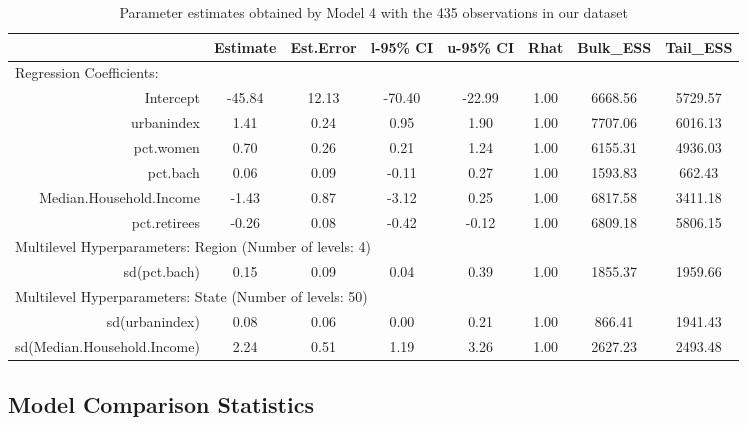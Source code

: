 \documentclass[12pt]{article}
\begin{document}
\begin{table}[ht]
	\centering
	\begin{adjustbox}{max width=\textwidth}
	\begin{tabular}{rccccccc}
		\hline
		& Estimate & Est.Error & l-95\% CI & u-95\% CI & Rhat & Bulk\_ESS & Tail\_ESS \\ 
		\hline
				 \multicolumn{8}{l}{Regression Coefficients:} \\
		Intercept & -45.84 & 12.13 & -70.40 & -22.99 & 1.00 & 6668.56 & 5729.57 \\ 
		urbanindex & 1.41 & 0.24 & 0.95 & 1.90 & 1.00 & 7707.06 & 6016.13 \\ 
		pct.women & 0.70 & 0.26 & 0.21 & 1.24 & 1.00 & 6155.31 & 4936.03 \\ 
		pct.bach & 0.06 & 0.09 & -0.11 & 0.27 & 1.00 & 1593.83 & 662.43 \\ 
		Median.Household.Income & -1.43 & 0.87 & -3.12 & 0.25 & 1.00 & 6817.58 & 3411.18 \\ 
		pct.retirees & -0.26 & 0.08 & -0.42 & -0.12 & 1.00 & 6809.18 & 5806.15 \\
		\midrule
		\multicolumn{8}{l}{Multilevel Hyperparameters: Region (Number of levels: 4)} \\ 
		sd(pct.bach) & 0.15 & 0.09 & 0.04 & 0.39 & 1.00 & 1855.37 & 1959.66 \\
		\midrule
		\multicolumn{8}{l}{Multilevel Hyperparameters: State (Number of levels: 50)}                       \\  
		sd(urbanindex) & 0.08 & 0.06 & 0.00 & 0.21 & 1.00 & 866.41 & 1941.43 \\ 
		sd(Median.Household.Income) & 2.24 & 0.51 & 1.19 & 3.26 & 1.00 & 2627.23 & 2493.48 \\ 
		\hline
	\end{tabular}
	\end{adjustbox}
	\caption{Parameter estimates obtained by Model 4 with the 435 observations in our dataset}
	\label{tab:model4}
\end{table}







\FloatBarrier

\subsection*{Model Comparison Statistics}
\end{document}
